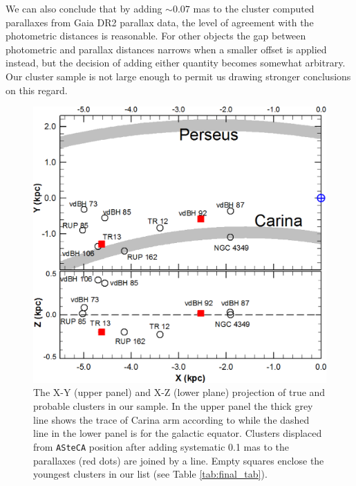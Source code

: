 \documentclass[draft]{aa}
\begin{document}
We can also conclude that by adding $\sim0.07$ mas to the cluster computed
parallaxes from Gaia DR2 parallax data, the level of agreement with the
photometric distances is reasonable.
For other objects the gap between photometric and parallax distances narrows
when a smaller offset is applied instead, but the decision of
adding either quantity becomes somewhat arbitrary. Our cluster sample is not
large enough to permit us drawing stronger conclusions on this regard.


\begin{figure}[ht]
    \centering
    \includegraphics[width=\hsize]{../figs/xy_xz.png}
    \caption{The X-Y (upper panel) and X-Z (lower plane) projection of true and
    probable clusters in our sample. In the upper panel the thick grey line
    shows the trace of Carina arm according to \cite{valle_2005} while the
    dashed line in the lower panel is for the galactic equator. Clusters
    displaced from \texttt{ASteCA} position after adding systematic 0.1 mas to
    the parallaxes (red dots) are joined by a line. Empty squares enclose the
    youngest clusters in our list (see Table \ref{tab:final_tab}).}
    \label{fig68}
\end{figure}
\end{document}
